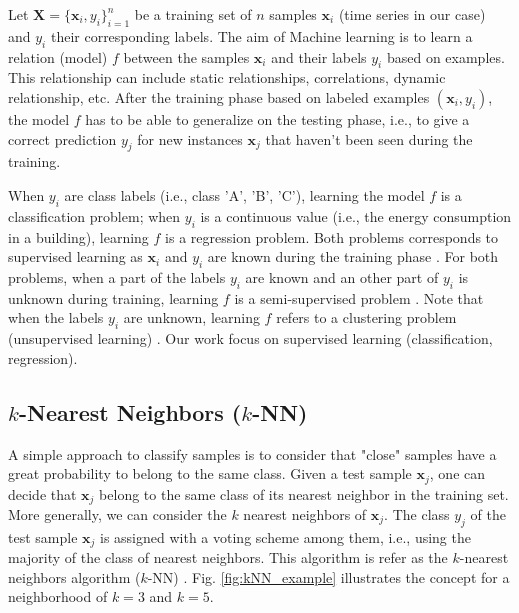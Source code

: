 Let $\textbf{X}=\{\textbf{x}_i,y_i\}_{i=1}^n$ be a training set of $n$ samples $\textbf{x}_i$ (time series in our case) and $y_i$ their corresponding labels. The aim of Machine learning is to learn a relation (model) $f$ between the samples $\textbf{x}_i$ and their labels $y_i$ based on examples. This relationship can include static relationships, correlations, dynamic relationship, etc. After the training phase based on labeled examples $(\textbf{x}_i,y_i)$, the model $f$ has to be able to generalize on the testing phase, i.e., to give a correct prediction $y_j$ for new instances $\textbf{x}_j$ that haven't been seen during the training.

When $y_i$ are class labels (i.e., class 'A', 'B', 'C'), learning the model $f$ is a classification problem; when $y_i$ is a continuous value (i.e., the energy consumption in a building), learning $f$ is a regression problem. Both problems corresponds to supervised learning as $\textbf{x}_i$ and $y_i$ are known during the training phase . For both problems, when a part of the labels $y_i$ are known and an other part of $y_i$ is unknown during training, learning $f$ is a semi-supervised problem . Note that when the labels $y_i$ are unknown, learning $f$ refers to a clustering problem (unsupervised learning) . Our work focus on supervised learning (classification, regression).


\subsection{$k$-Nearest Neighbors ($k$-NN)}

A simple approach to classify samples is to consider that "close" samples have a great probability to belong to the same class. Given a test sample $\textbf{x}_j$, one can decide that $\textbf{x}_j$ belong to the same class of its nearest neighbor in the training set. More generally, we can consider the $k$ nearest neighbors of $\textbf{x}_j$. The class $y_j$ of the test sample $\textbf{x}_j$ is assigned with a voting scheme among them, i.e., using the majority of the class of nearest neighbors. This algorithm is refer as the $k$-nearest neighbors algorithm ($k$-NN) \cite{Duda1973,Dreyfus2006}. Fig. \ref{fig:kNN_example} illustrates the concept for a neighborhood of $k=3$ and $k=5$.

